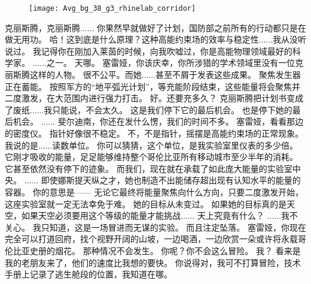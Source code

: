 \documentclass[openany]{book}
\begin{document}
\begin{figure}[h]
    \centering
    \texttt{[image: Avg\_bg\_38\_g3\_rhinelab\_corridor]}
\end{figure}
\begin{dialogue}
     克丽斯腾，克丽斯腾......
     你果然早就做好了计划，国防部之前所有的行动都只是在做无用功。
     哈！这到底是什么原理？这种高能约束场的效率与稳定性......我从没听说过。
     我记得你在刚加入莱茵的时候，向我吹嘘过，你是高能物理领域最好的科学家。
     ......之一。
     天哪。
     塞雷娅，你该庆幸，你所涉猎的学术领域里没有一位克丽斯腾这样的人物。
     很不公平。而她......甚至不屑于发表这些成果。
     聚焦发生器正在蓄能。
     按照军方的“地平弧光计划”，等充能阶段结束，这些能量将会聚焦并二度激发，在大范围内进行强力打击。
     好。还要充多久？
     克丽斯腾把计划书变成了废纸......我只能说，不会太久。
     这是我们停下它的最后机会。
     也是停下她的最后机会。
     ......
     斐尔迪南，你还在发什么愣，我们的时间不多。
     塞雷娅，看看那边的密度仪。
     指针好像很不稳定。
     不，不是指针，摇摆是高能约束场的正常现象。我说的是......读数单位。
     你可以猜猜，这个单位，是我实验室里仪表的多少倍。
     它刚才吸收的能量，足足能够维持整个哥伦比亚所有移动城市至少半年的消耗。
     它甚至依然没有停下的迹象。
     而我们，现在就在承载了如此庞大能量的实验室中央。
     ......
     即使娜斯提天纵之才，她也制造不出能储存超出现有认知水平的能量的容器。
     你的意思是——
     无论它最终将能量聚焦向什么方向，只要二度激发开始，这座实验室就一定无法幸免于难。
     她的目标从未变过。
     如果她的目标真的是天空，如果天空必须要用这个等级的能量才能挑战......
     天上究竟有什么？
     ......我不关心。
     我只知道，这是一场冒进而无谋的实验。
     而且注定坠落。
     塞雷娅，你现在完全可以打道回府，找个视野开阔的山坡，一边喝酒，一边欣赏一朵或许将永载哥伦比亚史册的烟花。
     那种情况不会发生。
     你呢？你不会这么冒险。
     我？
     看来是我的老朋友来了，他们的速度比我想的要快。
     你说得对，我可不打算冒险，技术手册上记录了逃生舱段的位置，我知道在哪。

\end{dialogue}
\end{document}
